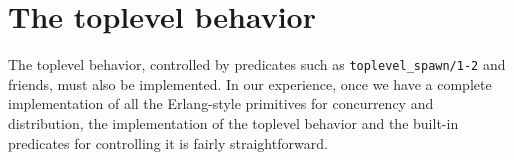 


\section{The toplevel behavior}\label{sec:toplevel-implementation}

The toplevel behavior, controlled by predicates such as \texttt{toplevel\_spawn/1-2} and friends, must also be implemented. In our experience, once we have a complete implementation of all the Erlang-style primitives for concurrency and distribution, the implementation of the toplevel behavior and the built-in predicates for controlling it is fairly straightforward.

